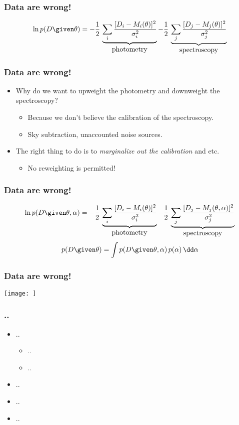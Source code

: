 \documentclass[pdftex]{beamer}
\begin{document}
\begin{frame}
  \frametitle{Data are wrong!}
  $$\ln p(D\given\theta)
     = -\frac{1}{2}\,\underbrace{\sum_{i} \frac{[D_i - M_i(\theta)]^2}{\sigma_i^2}}_{\mbox{photometry}}
       -\frac{1}{2}\,\underbrace{\sum_{j} \frac{[D_j - M_j(\theta)]^2}{\sigma_j^2}}_{\mbox{spectroscopy}}
  $$
\end{frame}

\begin{frame}
  \frametitle{Data are wrong!}
  \begin{itemize}
  \item Why do we want to upweight the photometry and downweight the spectroscopy?
    \begin{itemize}
    \item Because we don't believe the calibration of the spectroscopy.
    \item Sky subtraction, unaccounted noise sources.
    \end{itemize}
  \item The right thing to do is to \emph{marginalize out the calibration} and etc.
    \begin{itemize}
    \item No reweighting is permitted!
    \end{itemize}
  \end{itemize}
\end{frame}

\begin{frame}
  \frametitle{Data are wrong!}
  $$\ln p(D\given\theta,\alpha)
     = -\frac{1}{2}\,\underbrace{\sum_{i} \frac{[D_i - M_i(\theta)]^2}{\sigma_i^2}}_{\mbox{photometry}}
       -\frac{1}{2}\,\underbrace{\sum_{j} \frac{[D_j - M_j(\theta,\alpha)]^2}{\sigma_j^2}}_{\mbox{spectroscopy}}
  $$ $$
    p(D\given\theta) = \int p(D\given\theta,\alpha)\,p(\alpha)\,\dd\alpha
  $$
\end{frame}

\begin{frame}
  \frametitle{Data are wrong!}
  \texttt{[image: ]}
\end{frame}

\begin{frame}
  \frametitle{..}
  \begin{itemize}
  \item ..
    \begin{itemize}
    \item ..
    \item ..
    \end{itemize}
  \item ..
  \item ..
  \item ..
  \end{itemize}
\end{frame}
\end{document}
